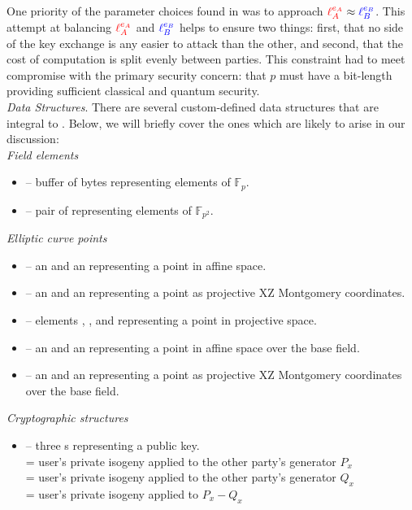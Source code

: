 One priority of the parameter choices found in  was to approach $\textcolor{red}{\ell_{A}^{e_A}} \approx \textcolor{blue}{\ell_{B}^{e_B}}$. This attempt at balancing $\textcolor{red}{\ell_{A}^{e_A}}$ and $\textcolor{blue}{\ell_{B}^{e_B}}$ helps to ensure two things: first, that no side of the key exchange is any easier to attack than the other, and second, that the cost of computation is split evenly between parties. This constraint had to meet compromise with the primary security concern: that $p$ must have a bit-length providing sufficient classical and quantum security.\\

\noindent
\emph{Data Structures}. There are several custom-defined data structures that are integral to \sidh. Below, we will briefly cover the ones which are likely to arise in our discussion:\\

\noindent
\emph{Field elements}
\begin{itemize}
	\item {} -- buffer of bytes representing elements of $\mathbb{F}_{p}$.
	\item {} -- pair of  representing elements of $\mathbb{F}_{p^2}$.
\end{itemize}

\noindent
\emph{Elliptic curve points}
\begin{itemize}
	\item {} -- an   and an   representing a point in affine space.
	\item {} -- an   and an   representing a point as projective XZ Montgomery coordinates.
	\item {} --  elements , , and  representing a point in projective space.
	\item {} -- an   and an   representing a point in affine space over the base field.
	\item {} -- an   and an   representing a point as projective XZ Montgomery coordinates over the base field.
\end{itemize}

\noindent
\emph{Cryptographic structures}
\begin{itemize}
	\item {} -- three s representing a public key.\\
	 = user's private isogeny applied to the other party's generator $P_x$\\
	 = user's private isogeny applied to the other party's generator $Q_x$\\
	 = user's private isogeny applied to $P_x - Q_x$
\end{itemize}

